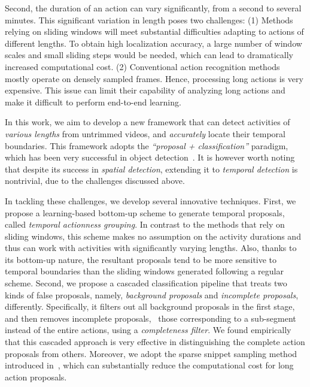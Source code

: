 \documentclass[10pt,twocolumn,letterpaper]{article}
\begin{document}
Second, the duration of an action can vary significantly, 
from a second to several minutes. 
This significant variation in length poses two challenges:
(1) Methods relying on sliding windows will meet substantial difficulties 
adapting to actions of different lengths. 
To obtain high localization accuracy, a large number of window scales and 
small sliding steps would be needed, which can lead to dramatically increased
computational cost.
(2) Conventional action recognition methods mostly operate on densely sampled
frames. Hence, processing long actions is very expensive. 
This issue can limit their capability of analyzing long actions and make it 
difficult to perform end-to-end learning.


In this work, we aim to develop a new framework that can 
detect activities of \emph{various lengths} from untrimmed videos,
and \emph{accurately} locate their temporal boundaries.  
This framework adopts the \emph{``proposal + classification''}
paradigm, which has been very successful 
in object detection~\cite{Gu2009RegionIdea,Girshick2014RCNN}.
It is however worth noting that despite its success in 
\emph{spatial detection}, extending it to \emph{temporal detection} 
is nontrivial, due to the challenges discussed above. 

In tackling these challenges, we develop several innovative techniques. 
First, we propose a learning-based bottom-up scheme to generate temporal proposals, 
called \emph{temporal actionness grouping}. 
In contrast to the methods that rely on sliding windows, this scheme makes no assumption on 
the activity durations and thus can work with activities with significantly varying lengths. 
Also, thanks to its bottom-up nature, the resultant proposals tend to be more sensitive to 
temporal boundaries than the sliding windows generated following a regular scheme. 
Second, we propose a cascaded classification pipeline that treats two kinds of false proposals,
namely, \emph{background proposals} and \emph{incomplete proposals}, differently. 
Specifically, it filters out all background proposals in the first stage, 
and then removes incomplete proposals, 
\ie~those corresponding to a sub-segment instead of the entire actions, 
using a \emph{completeness filter}. 
We found empirically that this cascaded approach is very effective in distinguishing 
the complete action proposals from others. 
Moreover, we adopt the sparse snippet sampling method
introduced in~\cite{Wang2016TSN}, which can substantially reduce the computational cost 
for long action proposals. 
\end{document}
